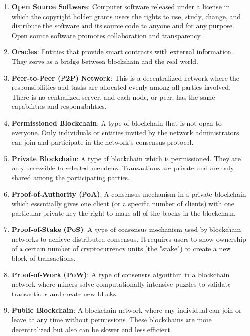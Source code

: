 \begin{enumerate}
    \item \textbf{Open Source Software}: Computer software released under a license in which the copyright holder grants users the rights to use, study, change, and distribute the software and its source code to anyone and for any purpose. Open source software promotes collaboration and transparency.

    \item \textbf{Oracles}: Entities that provide smart contracts with external information. They serve as a bridge between blockchain and the real world.

    \item \textbf{Peer-to-Peer (P2P) Network}: This is a decentralized network where the responsibilities and tasks are allocated evenly among all parties involved. There is no centralized server, and each node, or peer, has the same capabilities and responsibilities.

    \item \textbf{Permissioned Blockchain}: A type of blockchain that is not open to everyone. Only individuals or entities invited by the network administrators can join and participate in the network's consensus protocol.

    \item \textbf{Private Blockchain}: A type of blockchain which is permissioned. They are only accessible to selected members. Transactions are private and are only shared among the participating parties.

    \item \textbf{Proof-of-Authority (PoA)}: A consensus mechanism in a private blockchain which essentially gives one client (or a specific number of clients) with one particular private key the right to make all of the blocks in the blockchain.

    \item \textbf{Proof-of-Stake (PoS)}: A type of consensus mechanism used by blockchain networks to achieve distributed consensus. It requires users to show ownership of a certain number of cryptocurrency units (the "stake") to create a new block of transactions.

    \item \textbf{Proof-of-Work (PoW)}: A type of consensus algorithm in a blockchain network where miners solve computationally intensive puzzles to validate transactions and create new blocks.

    \item \textbf{Public Blockchain}: A blockchain network where any individual can join or leave at any time without permissions. These blockchains are more decentralized but also can be slower and less efficient.


\end{enumerate}
